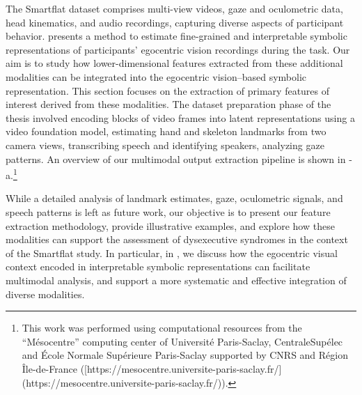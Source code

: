 The Smartflat dataset comprises multi-view videos, gaze and oculometric data, head kinematics, and audio recordings, capturing diverse aspects of participant behavior.  presents a method to estimate fine-grained and interpretable symbolic representations of participants’ egocentric vision recordings during the task. Our aim is to study how lower-dimensional features extracted from these additional modalities can be integrated into the egocentric vision–based symbolic representation. This section focuses on the extraction of primary features of interest derived from these modalities. The dataset preparation phase of the thesis involved encoding blocks of video frames into latent representations using a video foundation model, estimating hand and skeleton landmarks from two camera views, transcribing speech and identifying speakers, analyzing gaze patterns. An overview of our multimodal output extraction pipeline is shown in -a.\footnote{This work was performed using computational resources from the “Mésocentre” computing center of Université Paris-Saclay, CentraleSupélec and École Normale Supérieure Paris-Saclay supported by CNRS and Région Île-de-France ([https://mesocentre.universite-paris-saclay.fr/](https://mesocentre.universite-paris-saclay.fr/)). 
}



While a detailed analysis of landmark estimates, gaze, oculometric signals, and speech patterns is left as future work, our objective is to present our feature extraction methodology, provide illustrative examples, and explore how these modalities can support the assessment of dysexecutive syndromes in the context of the Smartflat study. In particular, in , we discuss how the egocentric visual context encoded in interpretable symbolic representations can facilitate multimodal analysis, and support a more systematic and effective integration of diverse modalities.


